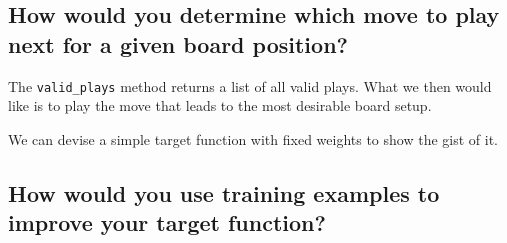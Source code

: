 \documentclass[11pt,a4paper]{article}
\begin{document}
    \subsection{How would you determine which move to play next for a given board position?} %
    \label{sub:how_would_you_determine_which_move_to_play_next_for_a_given_board_position_}
    
      The \texttt{valid_plays} method returns a list of all valid plays.
      What we then would like is to play the move that leads to the most desirable board setup.
      
      We can devise a simple target function with fixed weights to show the gist of it.
    
    
    \subsection{How would you use training examples to improve your target function?} %
    \label{sub:how_would_you_use_training_examples_to_improve_your_target_function_}
    
      \cdots
    
  
\end{document}
